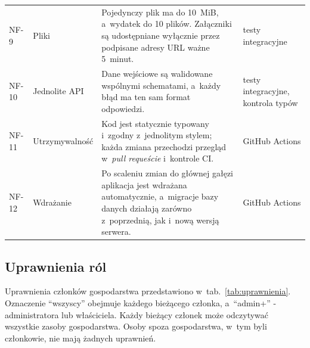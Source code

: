 \begin{small}
\begin{longtable}{@{}p{1.1cm}>{\raggedright\arraybackslash}p{2.6cm}>{\raggedright\arraybackslash}p{6.7cm}>{\raggedright\arraybackslash}p{3.3cm}@{}}
  NF-9 & Pliki & Pojedynczy plik ma do 10~MiB, a~wydatek do 10 plików. Załączniki są udostępniane wyłącznie przez podpisane adresy URL ważne 5~minut. & testy integracyjne \\
  NF-10 & Jednolite API & Dane wejściowe są walidowane wspólnymi schematami, a~każdy błąd ma ten sam format odpowiedzi. & testy integracyjne, kontrola typów \\
  NF-11 & Utrzymywalność & Kod jest statycznie typowany i~zgodny z~jednolitym stylem; każda zmiana przechodzi przegląd w~\emph{pull requeście} i~kontrole CI. & GitHub Actions \\
  NF-12 & Wdrażanie & Po scaleniu zmian do głównej gałęzi aplikacja jest wdrażana automatycznie, a~migracje bazy danych działają zarówno z~poprzednią, jak i~nową wersją serwera. & GitHub Actions \\
\end{longtable}
\end{small}

\subsection{Uprawnienia ról}

Uprawnienia członków gospodarstwa przedstawiono w~tab.~\ref{tab:uprawnienia}. Oznaczenie \enquote{wszyscy} obejmuje każdego bieżącego członka, a~\enquote{admin+} - administratora lub właściciela. Każdy bieżący członek może odczytywać wszystkie zasoby gospodarstwa. Osoby spoza gospodarstwa, w~tym byli członkowie, nie mają żadnych uprawnień.

